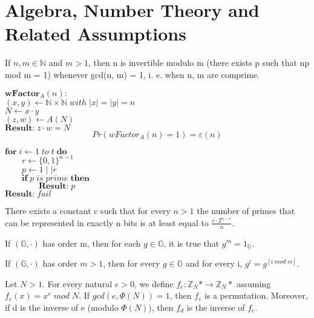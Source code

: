 \documentclass[../main]{subfiles}
\begin{document}
\chapter{Algebra, Number Theory and Related Assumptions}

\begin{lemma}
		If $n, m \in{} \mathbb{N}$ and $m > 1$, then n is invertible modulo m (there exists p such that np mod m = 1) whenever gcd(n, m) = 1, i. e. when n, m are comprime.
\end{lemma}

\noindent
$\textbf{wFactor}_A (n):$\\
$(x, y) \leftarrow{} \mathbb{N} \times{} \mathbb{N} \; with \; |x| = |y| = n$\\
$N \leftarrow{} x \cdot{} y$\\
$(z, w) \leftarrow{} A(N)$\\
$\textbf{Result:} \; z \cdot{} w = N$\\
$$Pr(wFactor_A (n) = 1) = \varepsilon{} (n)$$

\noindent
$\textbf{for} \; i \leftarrow{} 1 \; to \; t \; \textbf{do}$\\
$\quad{}\quad{}r \leftarrow{} \{0, 1\}^{n-1}$\\
$\quad{}\quad{}p \leftarrow{} 1\mid\mid r$\\
$\quad{}\quad{}\textbf{if} \; p \; is \; prime \; \textbf{then}$\\
$\quad{}\quad{}\quad{}\quad{}\textbf{Result:} \; p$\\
$\textbf{Result:} \; fail$\\

\begin{theorem}
	There exists a constant c such that for every $n > 1$ the number of primes that can be represented in exactly n bits is at least equal to $\frac{c \cdot{} 2^{n-1}}{n}$.
\end{theorem}

\begin{theorem}
	If $(\mathbb{G}, \cdot)$ has order m, then for each $g \in{} \mathbb{G}$, it is true that $g^m = 1_{\mathbb{G}}$.
\end{theorem}

\begin{corollary}
	If $(\mathbb{G}, \cdot)$ has order $m > 1$, then for every $g \in{} \mathbb{G}$ and for every i, $g^i = g^{[i \; mod \; m]}$.
\end{corollary}

\begin{theorem}
	Let $N > 1$. For every natural $e > 0$, we define $f_e : \mathbb{Z}_N* \rightarrow{} \mathbb{Z}_N*$ assuming $f_e (x) = x^e \; mod \; N$.
	If $gcd(e, \Phi (N)) = 1$, then $f_e$ is a permutation. Moreover, if d is the inverse of e (modulo $\Phi (N)$), then $f_d$ is the inverse of $f_e$.
\end{theorem}
\end{document}
